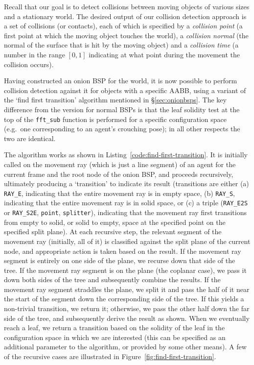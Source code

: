 \documentclass[10pt,twocolumn]{article}
\begin{document}
Recall that our goal is to detect collisions between moving objects of various sizes and a stationary world. The desired output of our collision detection approach is a set of collisions (or contacts), each of which is specified by a \emph{collision point} (a first point at which the moving object touches the world), a \emph{collision normal} (the normal of the surface that is hit by the moving object) and a \emph{collision time} (a number in the range $[0,1]$ indicating at what point during the movement the collision occurs).

Having constructed an onion BSP for the world, it is now possible to perform collision detection against it for objects with a specific AABB, using a variant of the `find first transition' algorithm mentioned in \S\ref{sec:onionbsps}. The key difference from the version for normal BSPs is that the leaf solidity test at the top of the \texttt{fft\_sub} function is performed for a specific configuration space (e.g.~one corresponding to an agent's crouching pose); in all other respects the two are identical.

The algorithm works as shown in Listing~\ref{code:find-first-transition}. It is initially called on the movement ray (which is just a line segment) of an agent for the current frame and the root node of the onion BSP, and proceeds recursively, ultimately producing a `transition' to indicate its result (transitions are either (a) \texttt{RAY\_E}, indicating that the entire movement ray is in empty space, (b) \texttt{RAY\_S}, indicating that the entire movement ray is in solid space, or (c) a triple (\texttt{RAY\_E2S} or \texttt{RAY\_S2E}, \texttt{point}, \texttt{splitter}), indicating that the movement ray first transitions from empty to solid, or solid to empty, space at the specified point on the specified split plane). At each recursive step, the relevant segment of the movement ray (initially, all of it) is classified against the split plane of the current node, and appropriate action is taken based on the result. If the movement ray segment is entirely on one side of the plane, we recurse down that side of the tree. If the movement ray segment is on the plane (the coplanar case), we pass it down both sides of the tree and subsequently combine the results. If the movement ray segment straddles the plane, we split it and pass the half of it near the start of the segment down the corresponding side of the tree. If this yields a non-trivial transition, we return it; otherwise, we pass the other half down the far side of the tree, and subsequently derive the result as shown. When we eventually reach a leaf, we return a transition based on the solidity of the leaf in the configuration space in which we are interested (this can be specified as an additional parameter to the algorithm, or provided by some other means). A few of the recursive cases are illustrated in Figure~\ref{fig:find-first-transition}.
\end{document}
